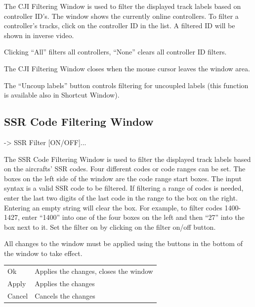 \documentclass[a4paper,oneside,11pt]{memoir}
\begin{document}
The CJI Filtering Window is used to filter the displayed track labels based on controller ID’s. The window shows the currently online controllers. To filter a controller’s tracks, click on the controller ID in the list. A filtered ID will be shown in inverse video.

\bigskip

Clicking “All” filters all controllers, “None” clears all controller ID filters.

\bigskip

The CJI Filtering Window closes when the mouse cursor leaves the window area.

\bigskip

The “Uncoup labels” button controls filtering for uncoupled labels (this function is available also in Shortcut Window).

\subsection{SSR Code Filtering Window}
\label{win:ssr}

 -> SSR Filter [ON/OFF]...

\bigskip


The SSR Code Filtering Window is used to filter the displayed track labels based on the aircrafts’ SSR codes. Four different codes or code ranges can be set. The boxes on the left side of the window are the code range start boxes. The input syntax is a valid SSR code to be filtered. If filtering a range of codes is needed, enter the last two digits of the last code in the range to the box on the right. Entering an empty string will clear the box. For example, to filter codes 1400-1427, enter “1400” into one of the four boxes on the left and then “27” into the box next to it. Set the filter on by clicking on the filter on/off button.

\bigskip

All changes to the window must be applied using the buttons in the bottom of the window to take effect.

\bigskip

\begin{longtable}{p{2.5cm} p{10cm}}
    Ok      & Applies the changes, closes the window\\
    Apply   & Applies the changes\\
    Cancel  & Cancels the changes\\
\end{longtable}
\end{document}
